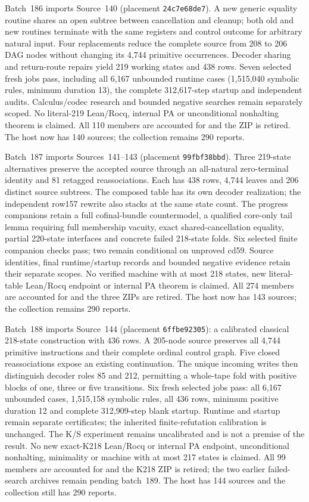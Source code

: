 \documentclass[11pt]{article}
\begin{document}
{Batch~186 imports Source~140 (placement \texttt{24c7e68de7}). A new generic equality
routine shares an open subtree between cancellation and cleanup; both old and
new routines terminate with the same registers and control outcome for arbitrary
natural input. Four replacements reduce the complete source from 208 to 206 DAG
nodes without changing its 4,744 primitive occurrences. Decoder sharing and
return-route repairs yield 219 working states and 438 rows. Seven selected fresh
jobs pass, including all 6,167 unbounded runtime cases (1,515,040 symbolic rules,
minimum duration 13), the complete 312,617-step startup and independent audits.
Calculus/codec research and bounded negative searches remain separately scoped.
No literal-219 Lean/Rocq, internal PA or unconditional nonhalting theorem is claimed.
All 110 members are accounted for and the ZIP is retired. The host now has 140
sources; the collection remains 290 reports.

Batch~187 imports Sources~141--143 (placement \texttt{99fbf38bbd}). Three
219-state alternatives preserve the accepted source through an all-natural
zero-terminal identity and 81 retagged reassociations. Each has 438 rows,
4,744 leaves and 206 distinct source subtrees. The composed table has its own
decoder realization; the independent row157 rewrite also stacks at the same
state count. The progress companions retain a full cofinal-bundle countermodel,
a qualified core-only tail lemma requiring full membership vacuity, exact
shared-cancellation equality, partial 220-state interfaces and concrete failed
218-state folds. Six selected finite companion checks pass; two remain conditional
on unproved cd59. Source identities, final runtime/startup records and bounded
negative evidence retain their separate scopes. No verified machine with at most
218 states, new literal-table Lean/Rocq endpoint or internal PA theorem is claimed.
All 274 members are accounted for and the three ZIPs are retired. The host now
has 143 sources; the collection remains 290 reports.

Batch~188 imports Source~144 (placement \texttt{6ffbe92305}): a calibrated
classical 218-state construction with 436 rows. A 205-node source preserves
all 4,744 primitive instructions and their complete ordinal control graph.
Five closed reassociations expose an existing continuation. The unique incoming
writes then distinguish decoder roles 85 and 212, permitting a whole-tape fold
with positive blocks of one, three or five transitions. Six fresh selected jobs
pass: all 6,167 unbounded cases, 1,515,158 symbolic rules, all 436 rows, minimum
positive duration 12 and complete 312,909-step blank startup. Runtime and
startup remain separate certificates; the inherited finite-refutation calibration
is unchanged. The K/S experiment remains uncalibrated and is not a
premise of the result. No new exact-K218 Lean/Rocq or internal PA endpoint,
unconditional nonhalting, minimality or machine with at most 217 states is claimed.
All 99 members are accounted for and the K218 ZIP is retired; the two earlier
failed-search archives remain pending batch~189. The host has 144 sources and
the collection still has 290 reports.

}
\end{document}
